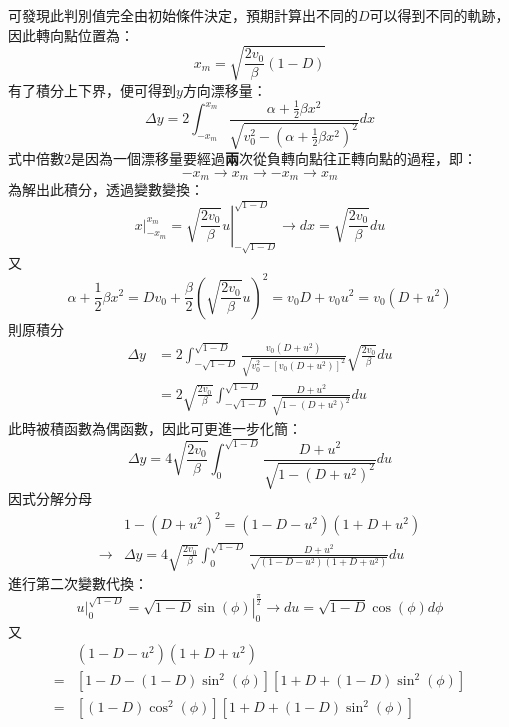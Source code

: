 \documentclass[12pt]{article}
\begin{document}
可發現此判別值完全由初始條件決定，預期計算出不同的$D$可以得到不同的軌跡，因此轉向點位置為：
\begin{equation}
    x_m=\sqrt{\frac{2v_0}{\beta}(1-D)}
\end{equation}
有了積分上下界，便可得到$y$方向漂移量：
\begin{equation}
    \Delta y=2\int_{-x_m}^{x_m}{\frac{\alpha+\frac12\beta x^2}{\sqrt{v_0^2-\left(\alpha+\frac12\beta x^2\right)^2}}}dx
\end{equation}
式中倍數$2$是因為一個漂移量要經過\textbf{兩}次從負轉向點往正轉向點的過程，即：
\[-x_m\to x_m\to -x_m\to x_m\]
為解出此積分，透過變數變換：
\begin{equation}
    \left.x\right|^{x_m}_{-x_m}=\left.\sqrt{\frac{2v_0}{\beta}}u\right|^{\sqrt{1-D}}_{-\sqrt{1-D}}\to dx=\sqrt{\frac{2v_0}{\beta}}du
\end{equation}
又
\begin{equation*}
    \alpha+\frac12\beta x^2=Dv_0+\frac{\beta}{2}\left(\sqrt{\frac{2v_0}{\beta}}u\right)^2=v_0D+v_0u^2=v_0(D+u^2)
\end{equation*}
則原積分
\begin{align*}
    \Delta y&=2\int_{-\sqrt{1-D}}^{\sqrt{1-D}}{\frac{v_0(D+u^2)}{\sqrt{v_0^2-[v_0(D+u^2)]^2}}}\sqrt{\frac{2v_0}{\beta}}du\\
    &=2\sqrt{\frac{2v_0}{\beta}}\int_{-\sqrt{1-D}}^{\sqrt{1-D}}{\frac{D+u^2}{\sqrt{1-(D+u^2)^2}}}du
\end{align*}
    此時被積函數為偶函數，因此可更進一步化簡：
    \begin{equation*}
        \Delta y=4\sqrt{\frac{2v_0}{\beta}}\int_{0}^{\sqrt{1-D}}{\frac{D+u^2}{\sqrt{1-(D+u^2)^2}}}du
    \end{equation*}
因式分解分母
\begin{align*}
    &1-(D+u^2)^2=(1-D-u^2)(1+D+u^2)\\
    \to&\Delta y=4\sqrt{\frac{2v_0}{\beta}}\int_{0}^{\sqrt{1-D}}{\frac{D+u^2}{\sqrt{(1-D-u^2)(1+D+u^2)}}}du
\end{align*}
進行第二次變數代換：
\begin{equation}
    \left.u\right|^{\sqrt{1-D}}_{0}=\left.\sqrt{1-D}\sin{(\phi)}\right|^{\frac{\pi}{2}}_{0}\to du=\sqrt{1-D}\cos{(\phi)}d\phi
\end{equation}
又
\begin{align*}
    &(1-D-u^2)(1+D+u^2)\nonumber\\
    =&[1-D-(1-D)\sin^2{(\phi)}][1+D+(1-D)\sin^2{(\phi)}]\nonumber\\
    =&[(1-D)\cos^2{(\phi)}][1+D+(1-D)\sin^2{(\phi)}]
\end{align*}
\end{document}
